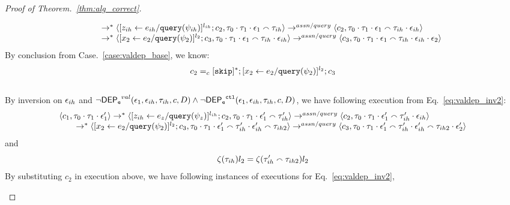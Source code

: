 \begin{proof}[Proof of Theorem.~\ref{thm:alg_correct}]
\begin{case}
\begin{subcase}
\begin{equation}
\begin{array}{l}
  \qquad \rightarrow^{*} 
  \langle [\mathrel{ z_{ih} \leftarrow e_{ih} / {\tt query}(\psi_{ih}) }]^{l_{ih}};{c}_2, 
  \mathtt{\tau}_0 \cdot \mathtt{\tau}_1 \cdot \mathtt{\epsilon}_1 \smallfrown \mathtt{\tau}_{ih} \rangle 
  \rightarrow^{assn/query} 
  \langle {c}_2,  \mathtt{\tau}_0 \cdot \mathtt{\tau}_1 \cdot \mathtt{\epsilon}_1 \smallfrown \mathtt{\tau}_{ih} \cdot \mathtt{\epsilon}_{ih} \rangle  \\
  \qquad \rightarrow^{*} 
  \langle [\mathrel{ {x}_2 \leftarrow e_2 / {\tt query}(\psi_2) }]^{l_2};{c}_3, 
  \mathtt{\tau}_0 \cdot \mathtt{\tau}_1 \cdot \mathtt{\epsilon}_1  \smallfrown \mathtt{\tau}_{ih} \cdot \mathtt{\epsilon}_{ih} \rangle 
  \rightarrow^{assn/query} 
  \langle {c}_3,  \mathtt{\tau}_0 \cdot \mathtt{\tau}_1 \cdot \mathtt{\epsilon}_1  \smallfrown \mathtt{\tau}_{ih} \cdot \mathtt{\epsilon}_{ih} \cdot \mathtt{\epsilon}_2 \rangle 
\end{array}
 \end{equation}
By conclusion from Case.~\ref{case:valdep_base}, we know:
\[
 c_2 =_c [\mathtt{skip}]{}^*; [\mathrel{ {x}_2 \leftarrow e_2 / {\tt query}(\psi_2) }]^{l_2};{c}_3
 \]
%
\\
By inversion on $\mathtt{\epsilon}_{ih}$ and $\neg \mathsf{DEP_{\mathtt{e}}}^{val}(\mathtt{\epsilon}_1, \mathtt{\epsilon}_{ih}, \mathtt{\tau}_{ih}, c, D) \land  \neg\mathsf{DEP_{\mathtt{e}}}^{\mathtt{{ctl}}}(\mathtt{\epsilon}_1, \mathtt{\epsilon}_{ih}, \mathtt{\tau}_{ih}, c, D) $,
we have following execution from Eq.~\ref{eq:valdep_inv2}:
\begin{equation}
\label{eq:m1asn_inv2}
  \begin{array}{l}   
  \langle c_1, \mathtt{\tau}_0 \cdot \mathtt{\tau}_1 \cdot \mathtt{\epsilon}_1' \rangle 
  \rightarrow^{*} 
  \langle [\mathrel{ z_{ih} \leftarrow e_z / {\tt query}(\psi_z) }]^{l_{ih}};{c}_2, 
  \mathtt{\tau}_0 \cdot \mathtt{\tau}_1 \cdot \mathtt{\epsilon}_1' \smallfrown \mathtt{\tau}_{ih}' \rangle 
  \rightarrow^{assn/query} 
  \langle {c}_2,  \mathtt{\tau}_0 \cdot \mathtt{\tau}_1 \cdot \mathtt{\epsilon}_1'  \smallfrown \mathtt{\tau}_{ih}' \cdot \mathtt{\epsilon}_{ih} \rangle  \\
  \qquad \rightarrow^{*} 
  \langle [\mathrel{ {x}_2 \leftarrow e_2 / {\tt query}(\psi_2) }]^{l_2};{c}_3, 
  \mathtt{\tau}_0 \cdot \mathtt{\tau}_1 \cdot \mathtt{\epsilon}_1'  \smallfrown \mathtt{\tau}_{ih}' \cdot \mathtt{\epsilon}_{ih}' \smallfrown \mathtt{\tau}_{ih2} \rangle 
  \rightarrow^{assn/query} 
  \langle {c}_3,  \mathtt{\tau}_0 \cdot \mathtt{\tau}_1 \cdot \mathtt{\epsilon}_1'  \smallfrown \mathtt{\tau}_{ih}' \cdot \mathtt{\epsilon}_{ih}' \smallfrown \mathtt{\tau}_{ih2} \cdot \mathtt{\epsilon}_2' \rangle 
\end{array}
 \end{equation}
and
 \[
 \mathtt{\zeta}(\mathtt{\tau}_{ih}) l_2 = \mathtt{\zeta}(\mathtt{\tau}_{ih}'\smallfrown \mathtt{\tau}_{ih2}) l_2
 \]
By substituting $c_2$  in execution above, 
we have following instances of executions for Eq.~\ref{eq:valdep_inv2}, 

\end{subcase}
\end{case}
\end{proof}
